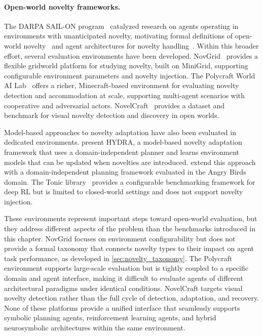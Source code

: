 \paragraph{Open-world novelty frameworks.}
The DARPA SAIL-ON program~\citep{senator2019science} catalyzed research on agents operating in environments with unanticipated novelty, motivating formal definitions of open-world novelty~\citep{boult2021towards,langley2020open} and agent architectures for novelty handling~\citep{muhammad2021novelty,goel2024neurosymbolic}. Within this broader effort, several evaluation environments have been developed. NovGrid~\citep{balloch2022novgrid} provides a flexible gridworld platform for studying novelty, built on MiniGrid, supporting configurable environment parameters and novelty injection. The Polycraft World AI Lab~\citep{goss2023polycraft} offers a richer, Minecraft-based environment for evaluating novelty detection and accommodation at scale, supporting multi-agent scenarios with cooperative and adversarial actors. NovelCraft~\citep{feeney2022novelcraft} provides a dataset and benchmark for visual novelty detection and discovery in open worlds.

Model-based approaches to novelty adaptation have also been evaluated in dedicated environments. \citet{klenk2020hydra} present HYDRA, a model-based novelty adaptation framework that uses a domain-independent planner and learns environment models that can be updated when novelties are introduced. \citet{stern2022hydra} extend this approach with a domain-independent planning framework evaluated in the Angry Birds domain. The Tonic library~\citep{pardo2020tonic} provides a configurable benchmarking framework for deep RL but is limited to closed-world settings and does not support novelty injection.

These environments represent important steps toward open-world evaluation, but they address different aspects of the problem than the benchmarks introduced in this chapter. NovGrid focuses on environment configurability but does not provide a formal taxonomy that connects novelty types to their impact on agent task performance, as developed in \cref{sec:novelty_taxonomy}. The Polycraft environment supports large-scale evaluation but is tightly coupled to a specific domain and agent interface, making it difficult to evaluate agents of different architectural paradigms under identical conditions. NovelCraft targets visual novelty detection rather than the full cycle of detection, adaptation, and recovery. None of these platforms provide a unified interface that seamlessly supports symbolic planning agents, reinforcement learning agents, and hybrid neurosymbolic architectures within the same environment.

